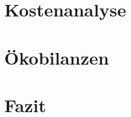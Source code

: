 \documentclass[12pt]{article}
\begin{document}
\section{Kostenanalyse}


\section{Ökobilanzen}


\section{Fazit}



\newpage

\end{document}
